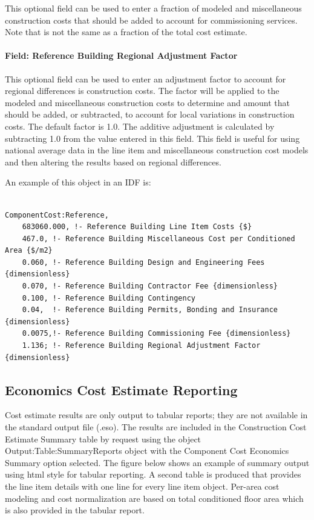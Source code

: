 This optional field can be used to enter a fraction of modeled and miscellaneous construction costs that should be added to account for commissioning services. Note that is not the same as a fraction of the total cost estimate.

\paragraph{Field: Reference Building Regional Adjustment Factor}\label{field-reference-building-regional-adjustment-factor}

This optional field can be used to enter an adjustment factor to account for regional differences is construction costs. The factor will be applied to the modeled and miscellaneous construction costs to determine and amount that should be added, or subtracted, to account for local variations in construction costs. The default factor is 1.0. The additive adjustment is calculated by subtracting 1.0 from the value entered in this field. This field is useful for using national average data in the line item and miscellaneous construction cost models and then altering the results based on regional differences.

An example of this object in an IDF is:

\begin{lstlisting}

ComponentCost:Reference,
    683060.000, !- Reference Building Line Item Costs {$}
    467.0, !- Reference Building Miscellaneous Cost per Conditioned Area {$/m2}
    0.060, !- Reference Building Design and Engineering Fees {dimensionless}
    0.070, !- Reference Building Contractor Fee {dimensionless}
    0.100, !- Reference Building Contingency
    0.04,  !- Reference Building Permits, Bonding and Insurance {dimensionless}
    0.0075,!- Reference Building Commissioning Fee {dimensionless}
    1.136; !- Reference Building Regional Adjustment Factor {dimensionless}
\end{lstlisting}

\subsection{Economics Cost Estimate Reporting}\label{economics-cost-estimate-reporting}

Cost estimate results are only output to tabular reports; they are not available in the standard output file (.eso). The results are included in the Construction Cost Estimate Summary table by request using the object Output:Table:SummaryReports object with the Component Cost Economics Summary option selected. The figure below shows an example of summary output using html style for tabular reporting. A second table is produced that provides the line item details with one line for every line item object. Per-area cost modeling and cost normalization are based on total conditioned floor area which is also provided in the tabular report.

